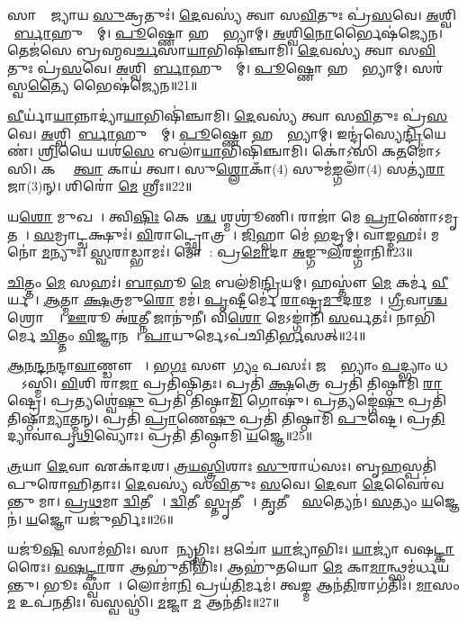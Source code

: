 𑌸𑌾𑌮𑍍𑌰𑌾᳚𑌜𑍍𑌯𑌾𑌯 \ul{𑌸𑍁}𑌕𑍍𑌰𑌤𑍁𑌃॑।
\ul{𑌦𑍇}𑌵𑌸𑍍𑌯॑ 𑌤𑍍𑌵𑌾 𑌸\ul{𑌵𑌿}𑌤𑍁𑌃 𑌪𑍍𑌰॑\ul{𑌸}𑌵𑍇।
\ul{𑌅}𑌶𑍍𑌵𑌿𑌨𑍋᳚\ul{𑌰𑍍𑌬𑌾}𑌹𑍁𑌭𑍍𑌯𑌾᳚𑌮𑍍।
\ul{𑌪𑍂}𑌷𑍍𑌣𑍋 𑌹𑌸𑍍𑌤𑌾᳚𑌭𑍍𑌯𑌾𑌮𑍍।
\ul{𑌅}𑌶𑍍𑌵𑌿\ul{𑌨𑍋}𑌰𑍍𑌭𑍈𑌷॑𑌜𑍍𑌯𑍇𑌨।
𑌤𑍇𑌜॑𑌸𑍇 𑌬𑍍𑌰𑌹𑍍𑌮𑌵\ul{𑌰𑍍𑌚}𑌸𑌾\ul{𑌯𑌾}𑌭𑌿𑌷𑌿॑𑌞𑍍𑌚𑌾𑌮𑌿।
\ul{𑌦𑍇}𑌵𑌸𑍍𑌯॑ 𑌤𑍍𑌵𑌾 𑌸\ul{𑌵𑌿}𑌤𑍁𑌃 𑌪𑍍𑌰॑\ul{𑌸}𑌵𑍇।
\ul{𑌅}𑌶𑍍𑌵𑌿𑌨𑍋᳚\ul{𑌰𑍍𑌬𑌾}𑌹𑍁𑌭𑍍𑌯𑌾᳚𑌮𑍍।
\ul{𑌪𑍂}𑌷𑍍𑌣𑍋 𑌹𑌸𑍍𑌤𑌾᳚𑌭𑍍𑌯𑌾𑌮𑍍।
𑌸𑌰॑𑌸𑍍𑌵\ul{𑌤𑍍𑌯𑍈} 𑌭𑍈𑌷॑𑌜𑍍𑌯𑍇𑌨॥21॥

\ul{𑌵𑍀}𑌰𑍍𑌯𑌾॑\ul{𑌯𑌾}𑌨𑍍𑌨𑌾𑌦𑍍𑌯𑌾॑\ul{𑌯𑌾}𑌭𑌿𑌷𑌿॑𑌞𑍍𑌚𑌾𑌮𑌿।
\ul{𑌦𑍇}𑌵𑌸𑍍𑌯॑ 𑌤𑍍𑌵𑌾 𑌸\ul{𑌵𑌿}𑌤𑍁𑌃 𑌪𑍍𑌰॑\ul{𑌸}𑌵𑍇।
\ul{𑌅}𑌶𑍍𑌵𑌿𑌨𑍋᳚\ul{𑌰𑍍𑌬𑌾}𑌹𑍁𑌭𑍍𑌯𑌾᳚𑌮𑍍।
\ul{𑌪𑍂}𑌷𑍍𑌣𑍋 𑌹𑌸𑍍𑌤𑌾᳚𑌭𑍍𑌯𑌾𑌮𑍍।
𑌇𑌨𑍍𑌦𑍍𑌰॑𑌸𑍍𑌯𑍇\ul{𑌨𑍍𑌦𑍍𑌰𑌿}𑌯𑍇𑌣॑।
\ul{𑌶𑍍𑌰𑌿}𑌯𑍈 𑌯𑌶॑\ul{𑌸𑍇} 𑌬𑌲𑌾॑\ul{𑌯𑌾}𑌭𑌿𑌷𑌿॑𑌞𑍍𑌚𑌾𑌮𑌿।
𑌕𑍋॑𑌽𑌸𑌿 𑌕\ul{𑌤}𑌮𑍋॑𑌽𑌸𑌿।
𑌕𑌸𑍍𑌮𑍈᳚ \ul{𑌤𑍍𑌵𑌾} 𑌕𑌾𑌯॑ 𑌤𑍍𑌵𑌾।
𑌸𑍁\ul{𑌶𑍍𑌲𑍋}𑌕𑌾𑌁(4) 𑌸𑍁𑌮॑\ul{𑌙𑍍𑌗}𑌲𑌾𑌁(4) 𑌸𑌤𑍍𑌯॑\ul{𑌰𑌾}𑌜𑌾(3)𑌨𑍍।
𑌶𑌿𑌰𑍋॑ \ul{𑌮𑍇} 𑌶𑍍𑌰𑍀𑌃॥22॥

𑌯\ul{𑌶𑍋} 𑌮𑍁𑌖𑌮𑍍᳚।
𑌤𑍍𑌵𑌿\ul{𑌷𑌿𑌃} 𑌕𑍇𑌶𑌾᳚\ul{𑌶𑍍𑌚} 𑌶𑍍𑌮𑌶𑍍𑌰𑍂॑𑌣𑌿।
𑌰𑌾𑌜𑌾॑ 𑌮𑍇 \ul{𑌪𑍍𑌰𑌾}𑌣𑍋॑\-𑌽𑌮𑍃𑌤𑌮𑍍᳚।
\ul{𑌸}𑌮𑍍𑌰𑌾𑌟𑍍𑌚𑌕𑍍𑌷𑍁𑌃॑।
\ul{𑌵𑌿}𑌰𑌾𑌟𑍍𑌛𑍍𑌰𑍋𑌤𑍍𑌰𑌮𑍍᳚।
\ul{𑌜𑌿}𑌹𑍍𑌵𑌾 𑌮𑍇॑ \ul{𑌭}𑌦𑍍𑌰𑌮𑍍।
𑌵𑌾𑌙𑍍𑌮𑌹𑌃॑।
𑌮𑌨𑍋॑ \ul{𑌮}𑌨𑍍𑌯𑍁𑌃।
\ul{𑌸𑍍𑌵}𑌰𑌾𑌡𑍍𑌭𑌾𑌮𑌃॑।
𑌮𑍋𑌦𑌾᳚: 𑌪𑍍𑌰\ul{𑌮𑍋}𑌦𑌾 \ul{𑌅}𑌙𑍍𑌗𑍁\ul{𑌲𑍀}𑌰𑌙𑍍𑌗𑌾॑𑌨𑌿॥23॥

\ul{𑌚𑌿}𑌤𑍍𑌤𑌂 \ul{𑌮𑍇} 𑌸𑌹𑌃॑।
\ul{𑌬𑌾}𑌹𑍂 \ul{𑌮𑍇} 𑌬𑌲॑𑌮𑌿\ul{𑌨𑍍𑌦𑍍𑌰𑌿}𑌯𑌮𑍍।
𑌹𑌸𑍍𑌤𑍗॑ \ul{𑌮𑍇} 𑌕𑌰𑍍𑌮॑ \ul{𑌵𑍀}𑌰𑍍𑌯𑌮𑍍᳚।
\ul{𑌆}𑌤𑍍𑌮𑌾 \ul{𑌕𑍍𑌷}𑌤𑍍𑌰𑌮𑍁\ul{𑌰𑍋} 𑌮𑌮॑।
\ul{𑌪𑍃}𑌷𑍍𑌟𑍀𑌰𑍍𑌮𑍇॑ \ul{𑌰𑌾}𑌷𑍍𑌟𑍍𑌰\ul{𑌮𑍁}𑌦\ul{𑌰}𑌮𑌸𑍗᳚।
\ul{𑌗𑍍𑌰𑍀}𑌵𑌾\ul{𑌶𑍍𑌚} 𑌶𑍍𑌰𑍋𑌣𑍍𑌯𑍗᳚।
\ul{𑌊}𑌰𑍂 𑌅॑\ul{𑌰}𑌤𑍍𑌨𑍀 𑌜𑌾𑌨𑍁॑𑌨𑍀।
𑌵𑌿\ul{𑌶𑍋} 𑌮𑍇𑌽𑌙𑍍𑌗𑌾॑𑌨𑌿 \ul{𑌸}𑌰𑍍𑌵𑌤𑌃॑।
𑌨𑌾𑌭𑌿॑𑌰𑍍𑌮𑍇 \ul{𑌚𑌿}𑌤𑍍𑌤𑌂 \ul{𑌵𑌿}𑌜𑍍𑌞𑌾𑌨𑌮𑍍᳚।
\ul{𑌪𑌾}𑌯𑍁𑌰𑍍𑌮𑍇\-𑌽𑌪॑𑌚𑌿𑌤𑌿\ul{𑌰𑍍𑌭}𑌸𑌤𑍍॥24॥

\ul{𑌆}\ul{𑌨}\ul{𑌨𑍍𑌦}\ul{𑌨}𑌨𑍍𑌦𑌾\ul{𑌵𑌾}𑌣𑍍𑌡𑍗 𑌮𑍇᳚।
𑌭\ul{𑌗𑌃} 𑌸𑍗𑌭𑌾᳚\ul{𑌗𑍍𑌯𑌂} 𑌪𑌸𑌃॑।
𑌜𑌙𑍍𑌘𑌾᳚𑌭𑍍𑌯𑌾𑌂 \ul{𑌪}𑌦𑍍𑌭𑍍𑌯𑌾𑌂 𑌧𑌰𑍍𑌮𑍋᳚\-𑌽𑌸𑍍𑌮𑌿।
\ul{𑌵𑌿}𑌶𑌿 𑌰𑌾\ul{𑌜𑌾} 𑌪𑍍𑌰𑌤𑌿॑\-𑌷𑍍𑌠𑌿𑌤𑌃।
𑌪𑍍𑌰𑌤𑌿॑ \ul{𑌕𑍍𑌷}𑌤𑍍𑌰𑍇 𑌪𑍍𑌰𑌤𑌿॑ 𑌤𑌿𑌷𑍍𑌠𑌾𑌮𑌿 \ul{𑌰𑌾}𑌷𑍍𑌟𑍍𑌰𑍇।
𑌪𑍍𑌰𑌤𑍍𑌯𑌶𑍍𑌵𑍇॑\ul{𑌷𑍁} 𑌪𑍍𑌰𑌤𑌿॑ 𑌤𑌿𑌷𑍍𑌠𑌾\ul{𑌮𑌿} 𑌗𑍋𑌷𑍁॑।
𑌪𑍍𑌰𑌤𑍍𑌯𑌙𑍍𑌗𑍇॑\ul{𑌷𑍁} 𑌪𑍍𑌰𑌤𑌿॑ 𑌤𑌿𑌷𑍍𑌠𑌾\ul{𑌮𑍍𑌯𑌾}𑌤𑍍𑌮𑌨𑍍।
𑌪𑍍𑌰𑌤𑌿॑ \ul{𑌪𑍍𑌰𑌾}𑌣𑍇\ul{𑌷𑍁} 𑌪𑍍𑌰𑌤𑌿॑ 𑌤𑌿𑌷𑍍𑌠𑌾𑌮𑌿 \ul{𑌪𑍁}𑌷𑍍𑌟𑍇।
𑌪𑍍𑌰\ul{𑌤𑌿} 𑌦𑍍𑌯𑌾𑌵𑌾॑𑌪𑍃\ul{𑌥𑌿}𑌵𑍍𑌯𑍋𑌃।
𑌪𑍍𑌰𑌤𑌿॑ 𑌤𑌿𑌷𑍍𑌠𑌾𑌮𑌿 \ul{𑌯}𑌜𑍍𑌞𑍇॥25॥

\ul{𑌤𑍍𑌰}𑌯𑌾 \ul{𑌦𑍇}𑌵𑌾 𑌏𑌕𑌾॑𑌦𑌶।
\ul{𑌤𑍍𑌰}\ul{𑌯}\ul{𑌸𑍍𑌤𑍍𑌰𑌿}\ul{}𑌶𑌾𑌃 \ul{𑌸𑍁}𑌰𑌾𑌧॑𑌸𑌃।
𑌬𑍃\ul{𑌹}𑌸𑍍𑌪𑌤𑌿॑𑌪𑍁𑌰𑍋\-𑌹𑌿𑌤𑌾𑌃।
\ul{𑌦𑍇}𑌵𑌸𑍍𑌯॑ 𑌸\ul{𑌵𑌿}𑌤𑍁𑌃 \ul{𑌸}𑌵𑍇।
\ul{𑌦𑍇}𑌵𑌾 \ul{𑌦𑍇}𑌵𑍈𑌰॑𑌵𑌨𑍍𑌤𑍁 𑌮𑌾।
\ul{𑌪𑍍𑌰}\ul{𑌥}𑌮𑌾 \ul{𑌦𑍍𑌵𑌿}𑌤𑍀𑌯𑍈𑌃᳚।
\ul{𑌦𑍍𑌵𑌿}𑌤𑍀𑌯𑌾᳚\ul{𑌸𑍍𑌤𑍃}𑌤𑍀𑌯𑍈𑌃᳚।
\ul{𑌤𑍃}𑌤𑍀𑌯𑌾𑌃᳚ \ul{𑌸}𑌤𑍍𑌯𑍇𑌨॑।
\ul{𑌸}𑌤𑍍𑌯𑌂 \ul{𑌯}𑌜𑍍𑌞𑍇𑌨॑।
\ul{𑌯}𑌜𑍍𑌞𑍋 𑌯𑌜𑍁॑𑌰𑍍𑌭𑌿𑌃॥26॥

𑌯𑌜𑍂॑\ul{𑌷𑌿} 𑌸𑌾𑌮॑𑌭𑌿𑌃।
𑌸𑌾𑌮𑌾᳚\ul{𑌨𑍍𑌯𑍃}𑌗𑍍𑌭𑌿𑌃।
𑌋𑌚𑍋॑ \ul{𑌯𑌾}𑌜𑍍𑌯𑌾॑𑌭𑌿𑌃।
\ul{𑌯𑌾}𑌜𑍍𑌯𑌾॑ 𑌵𑌷\ul{𑌟𑍍𑌕𑌾}𑌰𑍈𑌃।
\ul{𑌵}\ul{𑌷}\ul{𑌟𑍍𑌕𑌾}𑌰𑌾 𑌆𑌹𑍁॑𑌤𑌿𑌭𑌿𑌃।
𑌆𑌹𑍁॑𑌤𑌯𑍋 \ul{𑌮𑍇} 𑌕𑌾\ul{𑌮𑌾}𑌨𑍍𑌥𑍍𑌸𑌮॑𑌰𑍍𑌧𑌯𑌨𑍍𑌤𑍁।
𑌭𑍂𑌃 𑌸𑍍𑌵𑌾𑌹𑌾᳚।
𑌲𑍋𑌮𑌾॑\ul{𑌨𑌿} 𑌪𑍍𑌰𑌯॑\ul{𑌤𑌿}𑌰𑍍𑌮𑌮॑।
𑌤𑍍𑌵\ul{𑌙𑍍𑌮} 𑌆𑌨॑\ul{𑌤𑌿}𑌰𑌾𑌗॑𑌤𑌿𑌃।
\ul{𑌮𑌾}\ul{}𑌸𑌂 \ul{𑌮} 𑌉𑌪॑𑌨𑌤𑌿𑌃।
𑌵𑌸𑍍𑌵𑌸𑍍𑌥𑌿॑।
\ul{𑌮}𑌜𑍍𑌜𑌾 \ul{𑌮} 𑌆𑌨॑𑌤𑌿𑌃॥27॥\anuvakamend[\ul{𑌪}𑌸𑍍𑌤𑍍𑌯𑌾᳚𑌸𑍍𑌵𑌾 𑌸𑌰॑𑌸𑍍𑌵\ul{𑌤𑍍𑌯𑍈} 𑌭𑍈𑌷॑𑌜𑍍𑌯𑍇\ul{𑌨} 𑌶𑍍𑌰𑍀𑌰𑌙𑍍𑌗𑌾॑𑌨𑌿 \ul{𑌭}𑌸\ul{𑌦𑍍𑌯}𑌜𑍍𑌞𑍇 \ul{𑌯}𑌜𑍍𑌞𑍋 𑌯𑌜𑍁॑\ul{𑌰𑍍𑌭𑌿}𑌰𑍁𑌪॑𑌨\ul{𑌤𑌿}𑌰𑍍𑌦𑍍𑌵𑍇 𑌚॑]

